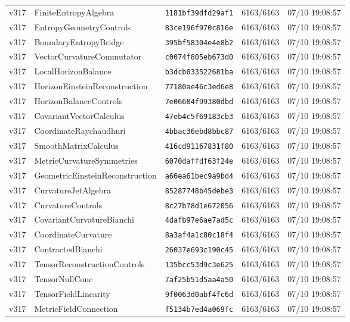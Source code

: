 \documentclass[11pt]{article}
\theoremstyle{definition}\newtheorem{deriv}{Derivation}
\begin{document}
{\begin{longtable}{@{}lllll@{}}
v317 & FiniteEntropyAlgebra & \texttt{1181bf39dfd29af1} & 6163/6163 & 07/10 19:08:57 \\
v317 & EntropyGeometryControls & \texttt{83ce196f970c816e} & 6163/6163 & 07/10 19:08:57 \\
v317 & BoundaryEntropyBridge & \texttt{395bf58304e4e8b2} & 6163/6163 & 07/10 19:08:57 \\
v317 & VectorCurvatureCommutator & \texttt{c0074f805eb673d0} & 6163/6163 & 07/10 19:08:57 \\
v317 & LocalHorizonBalance & \texttt{b3dcb033522681ba} & 6163/6163 & 07/10 19:08:57 \\
v317 & HorizonEinsteinReconstruction & \texttt{77180ae46c3ed6e8} & 6163/6163 & 07/10 19:08:57 \\
v317 & HorizonBalanceControls & \texttt{7e06684f99380dbd} & 6163/6163 & 07/10 19:08:57 \\
v317 & CovariantVectorCalculus & \texttt{47eb4c5f69183cb3} & 6163/6163 & 07/10 19:08:57 \\
v317 & CoordinateRaychaudhuri & \texttt{4bbac36ebd8bbc87} & 6163/6163 & 07/10 19:08:57 \\
v317 & SmoothMatrixCalculus & \texttt{416cd91167831f80} & 6163/6163 & 07/10 19:08:57 \\
v317 & MetricCurvatureSymmetries & \texttt{6070daffdf63f24e} & 6163/6163 & 07/10 19:08:57 \\
v317 & GeometricEinsteinReconstruction & \texttt{a66ea61bec9a9bd4} & 6163/6163 & 07/10 19:08:57 \\
v317 & CurvatureJetAlgebra & \texttt{85287748b45debe3} & 6163/6163 & 07/10 19:08:57 \\
v317 & CurvatureControls & \texttt{8c27b78d1e672056} & 6163/6163 & 07/10 19:08:57 \\
v317 & CovariantCurvatureBianchi & \texttt{4dafb97e6ae7ad5c} & 6163/6163 & 07/10 19:08:57 \\
v317 & CoordinateCurvature & \texttt{8a3af4a1c80c18f4} & 6163/6163 & 07/10 19:08:57 \\
v317 & ContractedBianchi & \texttt{26037e693c190c45} & 6163/6163 & 07/10 19:08:57 \\
v317 & TensorReconstructionControls & \texttt{135bcc53d9c3e625} & 6163/6163 & 07/10 19:08:57 \\
v317 & TensorNullCone & \texttt{7af25b51d5aa4a50} & 6163/6163 & 07/10 19:08:57 \\
v317 & TensorFieldLinearity & \texttt{9f0063d0abf4fc6d} & 6163/6163 & 07/10 19:08:57 \\
v317 & MetricFieldConnection & \texttt{f5134b7ed4a069fc} & 6163/6163 & 07/10 19:08:57 \\

\end{longtable}}
\end{document}
